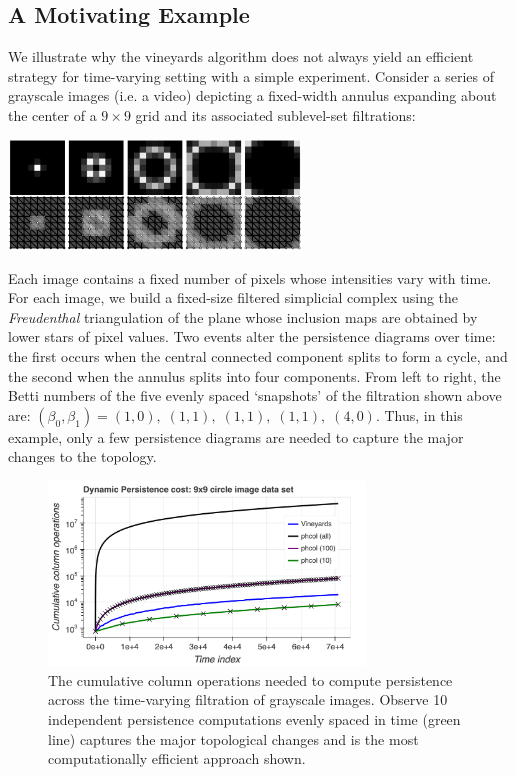 \documentclass[sn-mathphys]{sn-jnl}
\begin{document}
 \subsection{A Motivating Example}\label{sec:motivation} 
We illustrate why the vineyards algorithm does not always yield an efficient strategy for time-varying setting with a simple experiment. 
Consider a series of grayscale images (i.e. a video) depicting a fixed-width annulus expanding about the center of a $9 \times 9$ grid and its associated sublevel-set filtrations:   
\begin{center}
	\vspace{1em}
	\includegraphics[height=1.15in]{circle_complex.png}
\end{center}
Each image contains a fixed number of pixels whose intensities vary with time. For each image, we build a fixed-size filtered simplicial complex using the \emph{Freudenthal} triangulation of the plane whose inclusion maps are obtained by lower stars of pixel values.   
Two events alter the persistence diagrams over time: the first occurs when the central connected component splits to form a cycle, and the second  when the annulus  splits into four components. 
From left to right, the Betti numbers of the five evenly spaced `snapshots' of the filtration shown above are: $(\beta_0,\beta_1)  = (1,0), \; (1,1),  \; (1,1), \; (1,1), \; (4,0)$.
Thus, in this example, only a few persistence diagrams are needed to capture the major changes to the topology. 
\begin{figure}[t]
 	\centering
 	\includegraphics[width=0.75\textwidth]{circle_vineyards.png}
 	\caption{The cumulative column operations needed to compute persistence across the time-varying filtration of grayscale images. Observe 10 independent persistence computations evenly spaced in time (green line) captures the major topological changes and is the most computationally efficient approach shown.}
 	\label{fig:vineyards}
 \end{figure}
  
\end{document}
